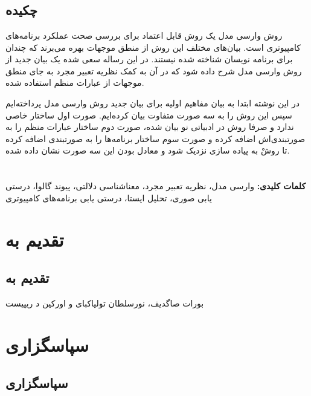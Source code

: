 \documentclass[12pt]{report}
\begin{document}
\newpage
\pagestyle{plain}
\setcounter{page}{1}
\chapter*{}
\section*{چکیده}
روش وارسی مدل یک روش قابل اعتماد برای بررسی صحت عملکرد برنامه‌های کامپیوتری است. بیان‌های مختلف این روش از منطق موجهات بهره می‌برند که چندان برای برنامه نویسان شناخته شده نیستند. در این رساله سعی شده یک بیان جدید از روش وارسی مدل شرح داده شود که در آن به کمک نظریه تعبیر مجرد به جای منطق موجهات از عبارات منظم استفاده شده.

در این نوشته ابتدا به بیان مفاهیم اولیه‌ برای بیان جدید روش وارسی مدل پرداخته‌ایم سپس این روش را به سه صورت متفاوت بیان کرده‌ایم. صورت اول ساختار خاصی ندارد و صرفا روش در ادبیاتی نو بیان شده، صورت دوم ساختار عبارات منظم را به صورتبندی‌اش اضافه کرده و صورت سوم ساختار برنامه‌ها را به صورتبندی اضافه کرده تا روشْ به پیاده سازی نزدیک شود و معادل بودن این سه صورت نشان داده شده.\\\\\\


\textbf{کلمات کلیدی:}
وارسی مدل، نظریه تعبیر مجرد، معناشناسی دلالتی، پیوند گالوا، درستی یابی صوری، تحلیل ایستا، درستی یابی برنامه‌های کامپیوتری
\chapter*{تقدیم به}
\section*{تقدیم به}
بورات صاگدیف، نورسلطان تولیاکبای و اورکین د ریپیست
\chapter*{سپاسگزاری}
\section*{سپاسگزاری}
\end{document}
